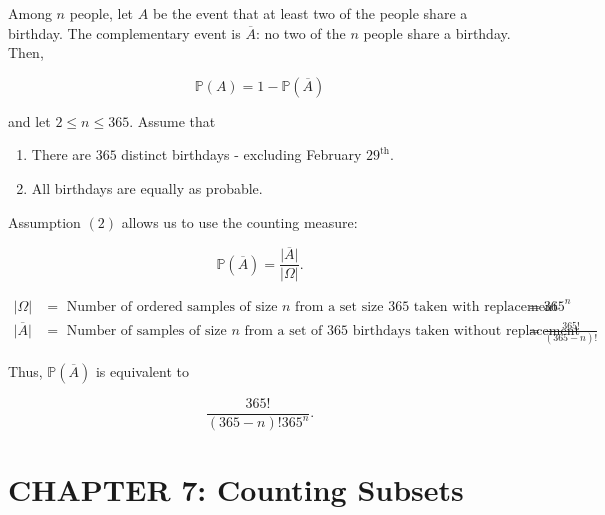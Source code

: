 \documentclass[12pt]{article}
\newcommand{\prob}[1]{\mathbb{P}(#1)}
\begin{document}
\noindent
Among $n$ people, let $A$ be the event that at least two of the people share a birthday. The complementary event is $\overline{A}$: no two of the $n$ people share a birthday. Then,

\begin{equation*}
\prob{A} = 1 - \prob{\overline{A}}
\end{equation*}

\noindent
and let $2 \leq n \leq 365$. Assume that

\begin{enumerate}
\item There are $365$ distinct birthdays - excluding February $29^{\text{th}}$.
\item All birthdays are equally as probable.
\end{enumerate}

\noindent
Assumption $(2)$ allows us to use the counting measure:

\begin{equation*}
\prob{\overline{A}} = \frac{\lvert \overline{A} \rvert}{\lvert \Omega \rvert}.
\end{equation*}

\begin{align*}
\lvert \Omega \rvert & =\text{ Number of ordered samples of size $n$ from a set size $365$ taken with replacement } = 365^n \\
\lvert \overline{A} \rvert & = \text{ Number of samples of size $n$ from a set of $365$ birthdays taken without replacement } = \frac{365!}{(365-n)!}
\end{align*}

\noindent
Thus, $\prob{\overline{A}}$ is equivalent to

\begin{equation*}
\frac{365!}{(365-n)! 365^n}.
\end{equation*}

\section*{CHAPTER 7: Counting Subsets}
\end{document}
